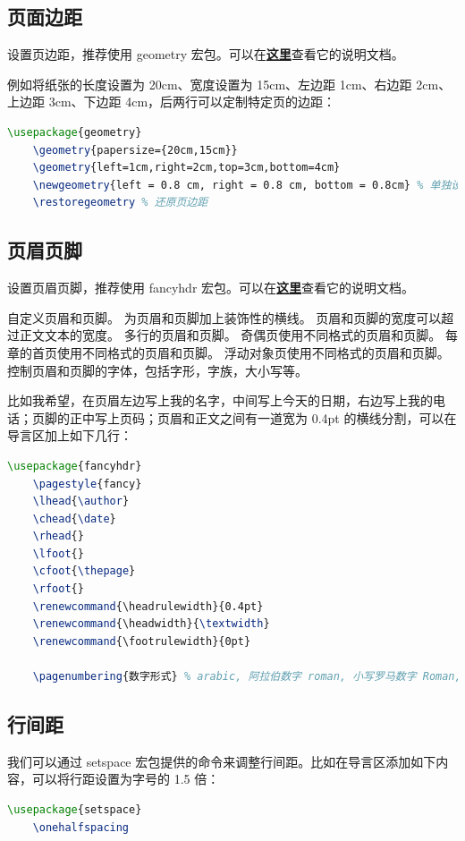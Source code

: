 \subsection{页面边距}

设置页边距，推荐使用 geometry 宏包。可以在\textbf{\href{http://texdoc.net/texmf-dist/doc/latex/geometry/geometry.pdf}{这里}}查看它的说明文档。

例如将纸张的长度设置为 20cm、宽度设置为 15cm、左边距 1cm、右边距 2cm、上边距 3cm、下边距 4cm，后两行可以定制特定页的边距：
\begin{lstlisting}[language={TeX}]
    \usepackage{geometry}
    \geometry{papersize={20cm,15cm}}
    \geometry{left=1cm,right=2cm,top=3cm,bottom=4cm}
    \newgeometry{left = 0.8 cm, right = 0.8 cm, bottom = 0.8cm} % 单独设置从此行向下的页边距
    \restoregeometry % 还原页边距
\end{lstlisting}

\subsection{页眉页脚}
设置页眉页脚，推荐使用 fancyhdr 宏包。可以在\textbf{\href{http://texdoc.net/texmf-dist/doc/latex/fancyhdr/fancyhdr.pdf}{这里}}查看它的说明文档。

自定义页眉和页脚。
为页眉和页脚加上装饰性的横线。
页眉和页脚的宽度可以超过正文文本的宽度。
多行的页眉和页脚。
奇偶页使用不同格式的页眉和页脚。
每章的首页使用不同格式的页眉和页脚。
浮动对象页使用不同格式的页眉和页脚。
控制页眉和页脚的字体，包括字形，字族，大小写等。

比如我希望，在页眉左边写上我的名字，中间写上今天的日期，右边写上我的电话；页脚的正中写上页码；页眉和正文之间有一道宽为 0.4pt 的横线分割，可以在导言区加上如下几行：

\begin{lstlisting}[language={TeX}]
    \usepackage{fancyhdr}
    \pagestyle{fancy}
    \lhead{\author}
    \chead{\date}
    \rhead{}
    \lfoot{}
    \cfoot{\thepage}
    \rfoot{}
    \renewcommand{\headrulewidth}{0.4pt}
    \renewcommand{\headwidth}{\textwidth}
    \renewcommand{\footrulewidth}{0pt}
    
    \pagenumbering{数字形式} % arabic, 阿拉伯数字 roman, 小写罗马数字 Roman,大写罗马数字 alpha, 小写拉丁字母 Alpha, 大写拉丁字母
\end{lstlisting}

\subsection{行间距}
我们可以通过 setspace 宏包提供的命令来调整行间距。比如在导言区添加如下内容，可以将行距设置为字号的 1.5 倍：
\begin{lstlisting}[language={TeX}]
    \usepackage{setspace}
    \onehalfspacing
\end{lstlisting}

